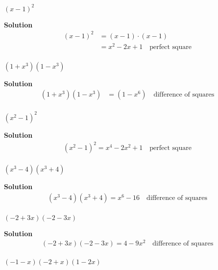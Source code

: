 \documentclass[6pt]{article}
\begin{document}
\begin{tcolorbox}[title=Problem 7, breakable]
${(x - 1)}^2$
\end{tcolorbox}

\textbf{Solution}
\begin{align*}
{(x - 1)}^2 &= (x - 1) \cdot (x - 1) \\
&= x^2 - 2x + 1 \quad \text{perfect square} \\
\end{align*}

\begin{tcolorbox}[title=Problem 11, breakable]
$(1 + x^3)(1 - x^3)$
\end{tcolorbox}

\textbf{Solution}
\begin{align*}
(1 + x^3)(1 - x^3) &= (1 - x^6) \quad \text{difference of squares} \\
\end{align*}

\begin{tcolorbox}[title=Problem 13, breakable]
${(x^2 - 1)}^2$
\end{tcolorbox}

\textbf{Solution}
\begin{align*}
{(x^2 - 1)}^2 = x^4 - 2x^2 + 1 \quad \text{perfect square} \\
\end{align*}

\begin{tcolorbox}[title=Problem 17, breakable]
$(x^3 - 4)(x^3 + 4)$
\end{tcolorbox}

\textbf{Solution}
\begin{align*}
(x^3 - 4)(x^3 + 4) = x^6 - 16 \quad \text{difference of squares} \\
\end{align*}

\begin{tcolorbox}[title=Problem 19, breakable]
$(-2 + 3x)(-2 - 3x)$
\end{tcolorbox}

\textbf{Solution}
\begin{align*}
(-2 + 3x)(-2 - 3x) = 4 - 9x^2 \quad \text{difference of squares} \\
\end{align*}


\begin{tcolorbox}[title=Problem 23, breakable]
$(-1 - x)(-2 + x)(1 - 2x)$
\end{tcolorbox}
\end{document}
